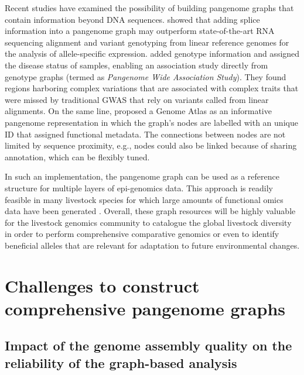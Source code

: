 \documentclass[../main.tex]{subfiles}
\begin{document}
Recent studies have examined the possibility of building pangenome graphs that contain information beyond DNA sequences. \citet{Sibbesen2021} showed that adding splice information into a pangenome graph may outperform state-of-the-art RNA sequencing alignment and variant genotyping from linear reference genomes for the analysis of allele-specific expression. \citet{Hokin2020} added genotype information and assigned the disease status of samples, enabling an association study directly from genotype graphs (termed as \emph{Pangenome Wide Association Study}). They found regions harboring complex variations that are associated with complex traits that were missed by traditional GWAS that rely on variants called from linear alignments. On the same line, \citet{kaye2021genome} proposed a Genome Atlas as an informative pangenome representation in which the graph’s nodes are labelled with an unique ID that assigned functional metadata. The connections between nodes are not limited by sequence proximity, e.g., nodes could also be linked because of sharing annotation, which can be flexibly tuned. 

In such an implementation, the pangenome graph can be used as a reference structure for multiple layers of epi-genomics data. This approach is readily feasible in many livestock species for which large amounts of functional omics data have been generated \citep{clark2020faang}. Overall, these graph resources will be highly valuable for the livestock genomics community to catalogue the global livestock diversity in order to perform comprehensive comparative genomics or even to identify beneficial alleles that are relevant for adaptation to future environmental changes.  

\section{Challenges to construct comprehensive pangenome graphs}

\subsection*{Impact of the genome assembly quality on the reliability of the graph-based analysis}
\end{document}
